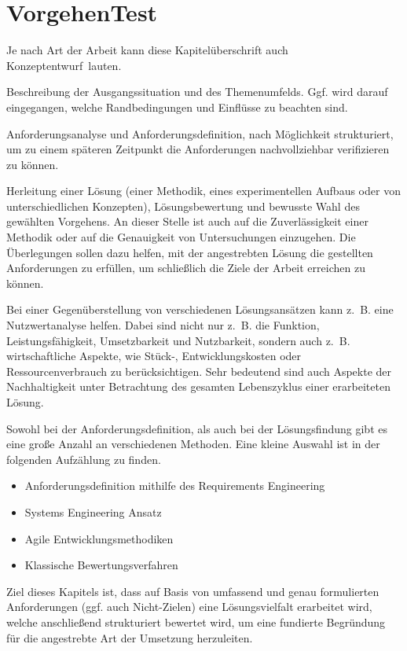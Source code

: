 \chapter{VorgehenTest}
\label{cha:vorgehen}

Je nach Art der Arbeit kann diese Kapitelüberschrift auch \glqq Konzeptentwurf\grqq~lauten.

Beschreibung der Ausgangssituation und des Themenumfelds. Ggf. wird darauf eingegangen, welche Randbedingungen und Einflüsse zu beachten sind.

Anforderungsanalyse und Anforderungsdefinition, nach Möglichkeit strukturiert, um zu einem späteren Zeitpunkt die Anforderungen nachvollziehbar verifizieren zu können.

Herleitung einer Lösung (einer Methodik, eines experimentellen Aufbaus oder von unterschiedlichen Konzepten), Lösungsbewertung und bewusste Wahl des gewählten Vorgehens. An dieser Stelle ist auch auf die Zuverlässigkeit einer Methodik oder auf die Genauigkeit von Untersuchungen einzugehen. Die Überlegungen sollen dazu helfen, mit der angestrebten Lösung die gestellten Anforderungen zu erfüllen, um schließlich die Ziele der Arbeit erreichen zu können.

Bei einer Gegenüberstellung von verschiedenen Lösungsansätzen kann z.~B. eine Nutzwertanalyse helfen. Dabei sind nicht nur z.~B. die Funktion, Leistungsfähigkeit, Umsetzbarkeit und Nutzbarkeit, sondern auch z.~B. wirtschaftliche Aspekte, wie Stück-, Entwicklungskosten oder Ressourcenverbrauch zu berücksichtigen. Sehr bedeutend sind auch Aspekte der Nachhaltigkeit unter Betrachtung des gesamten Lebenszyklus einer erarbeiteten Lösung.

Sowohl bei der Anforderungsdefinition, als auch bei der Lösungsfindung gibt es eine große Anzahl an verschiedenen Methoden. Eine kleine Auswahl ist in der folgenden Aufzählung zu finden.

\begin{itemize}
\item Anforderungsdefinition mithilfe des Requirements Engineering  \autocite{Pohl.2021}
\item Systems Engineering Ansatz \autocite{Schluter.2023}
\item Agile Entwicklungsmethodiken \autocite{Cohn.2010, Martin.2020, Wirdemann.2022}
\item Klassische Bewertungsverfahren \autocite{Breiing.1997, Zangemeister.2014}
\end{itemize}

Ziel dieses Kapitels ist, dass auf Basis von umfassend und genau formulierten Anforderungen (ggf. auch Nicht-Zielen) eine Lösungsvielfalt erarbeitet wird, welche anschließend strukturiert bewertet wird, um eine fundierte Begründung für die angestrebte Art der Umsetzung herzuleiten.